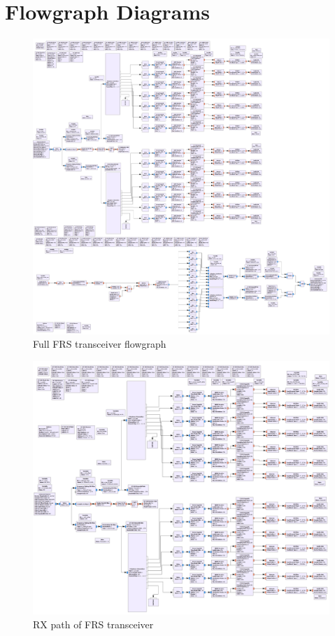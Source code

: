 \newpage
\section{Flowgraph Diagrams} \label{sec:diagrams}
\begin{figure}[h!]
  \label{fig:full_flowgraph}
  \centering
  \includegraphics[width=6.5in]{images/frs/bladeRF_frs_grc.png}
  \caption{Full FRS transceiver flowgraph}
\end{figure}

\newpage
\begin{figure}[h!]
  \label{fig:rx_flowgraph}
  \centering
  \includegraphics[width=6.5in]{images/frs/bladeRF_frs_rx_grc.png}
  \caption{RX path of FRS transceiver}
\end{figure}

